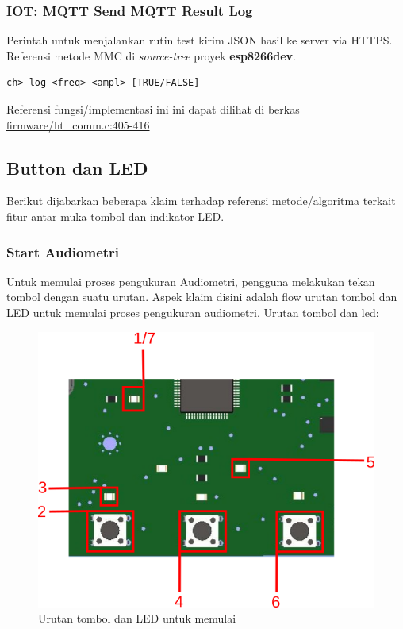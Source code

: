 \documentclass[12pt,]{article}
\begin{document}
	\subsubsection{IOT: MQTT Send MQTT Result Log}
	Perintah untuk menjalankan rutin test kirim JSON hasil ke server via HTTPS.
	Referensi metode MMC di \textit{source-tree} proyek \textbf{esp8266dev}.
	\begin{verbatim}
ch> log <freq> <ampl> [TRUE/FALSE]
	\end{verbatim}
	
	Referensi fungsi/implementasi ini ini dapat dilihat di berkas
	\href{https://github.com/VibrasticLab/pikoakustik/blob/stm32f401re_3pin/firmware/ht_comm.c#L405-L416}{firmware/ht\_comm.c:405-416}

	\subsection{Button dan LED}
	
	Berikut dijabarkan beberapa klaim terhadap referensi metode/algoritma terkait fitur antar muka tombol dan indikator LED.
	
	\subsubsection{Start Audiometri}
	
	Untuk memulai proses pengukuran Audiometri, pengguna melakukan tekan tombol dengan suatu urutan.
	Aspek klaim disini adalah flow urutan tombol dan LED untuk memulai proses pengukuran audiometri.
	Urutan tombol dan led:
	
	\begin{figure}[!ht]
		\centering
		\includegraphics[width=350pt]{images/ledbutton_step}
		\caption{Urutan tombol dan LED untuk memulai}
	\end{figure}
\end{document}
